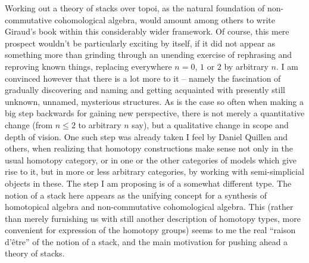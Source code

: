 Working out a theory of stacks over topoi, as the natural foundation
of non-commutative cohomological algebra, would amount among others to
write Giraud's book within this considerably wider framework. Of
course, this mere prospect wouldn't be particularly exciting by
itself, if it did not appear as something more than grinding through
an unending exercise of rephrasing and reproving known things,
replacing everywhere $n=0$, $1$ or $2$ by arbitrary $n$. I am
convinced however that there is a lot more to it -- namely the
fascination of gradually discovering and naming and getting acquainted
with presently still unknown, unnamed, mysterious structures. As is
the case so often when making a big step backwards for gaining new
perspective, there is not merely a quantitative change (from $n\le2$
to arbitrary $n$ say), but a qualitative change in scope and depth of
vision. One such step was already taken I feel by Daniel Quillen and
others, when realizing that homotopy constructions make sense not only
in the usual homotopy category, or in one or the other categories of
models which give rise to it, but in more or less arbitrary
categories, by working with semi-simplicial objects in these. The step
I am proposing is of a somewhat different type. The notion of a
stack here appears as the unifying concept for a synthesis of
homotopical algebra and non-commutative cohomological algebra. This (rather than merely furnishing us
with still another description of homotopy types, more convenient for
expression of the homotopy groups) seems to me the real ``raison
d'\^etre'' of the notion of a stack, and the main motivation for
pushing ahead a theory of stacks.

